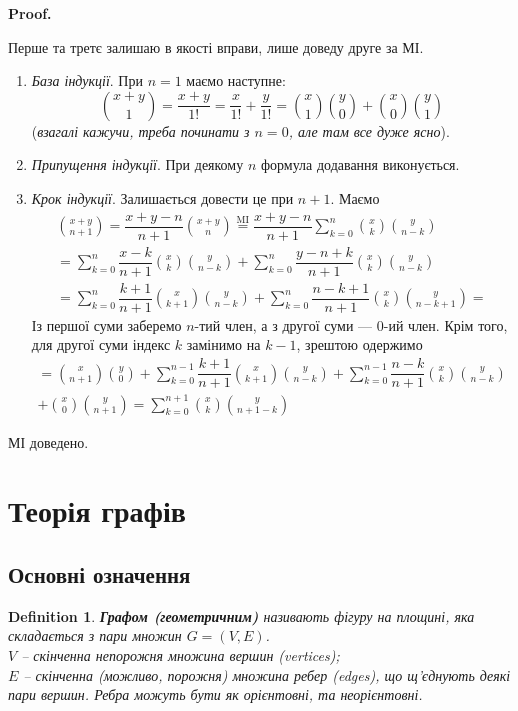 \documentclass[a4paper, 14pt]{extarticle}
\makeatletter
\theoremstyle{theoremdd}
\theoremstyle{theoremdd}
\newtheorem{definition}[theorem]{Definition}
\theoremstyle{theoremdd}
\theoremstyle{theoremdd}
\theoremstyle{theoremdd}
\theoremstyle{theoremdd}
\theoremstyle{theoremdd}
\theoremstyle{theoremdd}
\theoremstyle{theoremdd}
\theoremstyle{theoremdd}
\theoremstyle{theoremdd}
\theoremstyle{theoremdd}
\theoremstyle{theoremdd}
\theoremstyle{theoremdd}
\theoremstyle{theoremdd}
\renewenvironment{proof}[1][Proof.\\]{\par
\pushQED{\hfill \qed}%
\normalfont \topsep6\p@\@plus6\p@\relax
\trivlist
\item\relax
{\bfseries
#1\@addpunct{.}}\hspace\labelsep\ignorespaces
}{%
\popQED\endtrivlist\@endpefalse
}
\makeatother
\begin{document}
\begin{proof}
Перше та третє залишаю в якості вправи, лише доведу друге за МІ.
\begin{enumerate}[wide=0pt,label={\Roman*.}]
\item \textit{База індукції}. При $n = 1$ маємо наступне:
\[
{x+y \choose 1} = \dfrac{x+y}{1!} = \dfrac{x}{1!} + \dfrac{y}{1!} = {x \choose 1} {y \choose 0} + {x \choose 0} {y \choose 1}
\]
(\textit{взагалі кажучи, треба починати з $n = 0$, але там все дуже ясно}).

\item \textit{Припущення індукції}. При деякому $n$ формула додавання виконується.

\item \textit{Крок індукції}. Залишається довести це при $n+1$. Маємо
\begin{align*}
{x + y \choose n+1} = \dfrac{x+y-n}{n+1} { x+y \choose n } \overset{\text{MI}}{=} \dfrac{x+y-n}{n+1} \sum_{k=0}^n { x \choose k} { y \choose n-k} \\
= \sum_{k=0}^n \dfrac{x-k}{n+1} { x \choose k} { y \choose n-k} + \sum_{k=0}^n \dfrac{y-n+k}{n+1} { x \choose k} { y \choose n-k} \\
= \sum_{k=0}^n \dfrac{k+1}{n+1} { x \choose k+1} { y \choose n-k} + \sum_{k=0}^n \dfrac{n-k+1}{n+1} { x \choose k} { y \choose n-k+1} \boxed{=}
\end{align*}
Із першої суми заберемо $n$-тий член, а з другої суми --- $0$-ий член. Крім того, для другої суми індекс $k$ замінимо на $k-1$, зрештою одержимо
\begin{align*}
\boxed{=} {x \choose n+1} {y \choose 0} + \sum_{k=0}^{n-1} \dfrac{k+1}{n+1} { x \choose k+1} { y \choose n-k} + \sum_{k=0}^{n-1} \dfrac{n-k}{n+1} { x \choose k} { y \choose n-k} \\
+ {x \choose 0} {y \choose n+1} = \sum_{k=0}^{n+1} {x \choose k} {y \choose n+1-k}
\end{align*}
\end{enumerate}
МІ доведено.
\end{proof}
\newpage

\section{Теорія графів}
\subsection{Основні означення}
\begin{definition}
\textbf{Графом (геометричним)} називають фігуру на площині, яка складається з пари множин $G = (V,E)$.\\
$V$ -- скінченна непорожня множина вершин (vertices);\\
$E$ -- скінченна (можливо, порожня) множина ребер (edges), що щ'єднують деякі пари вершин. Ребра можуть бути як орієнтовні, та неорієнтовні.
\end{definition}
\end{document}
